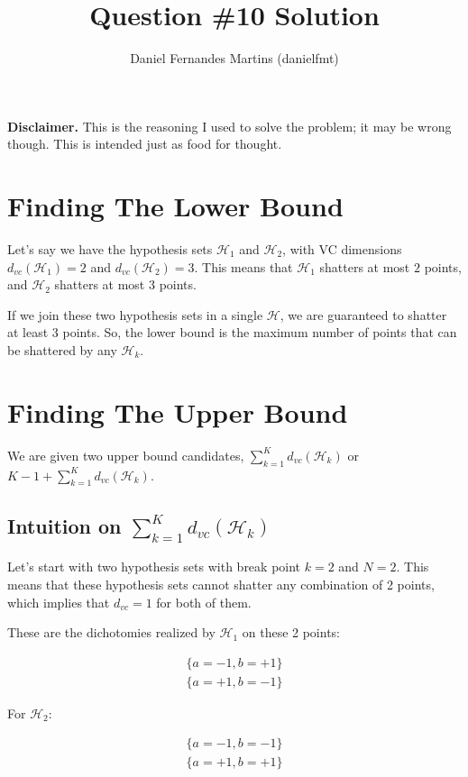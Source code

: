 \documentclass{article}
\author{Daniel Fernandes Martins (danielfmt)}
\title{Question \#10 Solution}
\begin{document}
\maketitle

\textbf{Disclaimer.} This is the reasoning I used to solve the problem; it
may be wrong though. This is intended just as food for thought.

\section{Finding The Lower Bound}

Let's say we have the hypothesis sets $\mathcal{H}_1$ and $\mathcal{H}_2$,
with VC dimensions $d_{vc}(\mathcal{H}_1)=2$ and $d_{vc}(\mathcal{H}_2)=3$.
This means that $\mathcal{H}_1$ shatters at most $2$ points, and
$\mathcal{H}_2$ shatters at most $3$ points.

If we join these two hypothesis sets in a single $\mathcal{H}$, we are
guaranteed to shatter at least $3$ points. So, the lower bound is the
maximum number of points that can be shattered by any $\mathcal{H}_k$.

\section{Finding The Upper Bound}

We are given two upper bound candidates, $\sum_{k=1}^Kd_{vc}(\mathcal{H}_k)$
or $K-1+\sum_{k=1}^Kd_{vc}(\mathcal{H}_k)$.

\subsection {Intuition on $\sum_{k=1}^Kd_{vc}(\mathcal{H}_k)$}

Let's start with two hypothesis sets with break point $k=2$ and $N=2$. This
means that these hypothesis sets cannot shatter any combination of 2 points,
which implies that $d_{vc}=1$ for both of them.

These are the dichotomies realized by $\mathcal{H}_1$ on these 2 points:

\begin{equation*}
\begin{split}
\{a=-1, b=+1\} \\
\{a=+1, b=-1\}
\end{split}
\end{equation*}

For $\mathcal{H}_2$:

\begin{equation*}
\begin{split}
\{a=-1, b=-1\} \\
\{a=+1, b=+1\}
\end{split}
\end{equation*}
\end{document}
